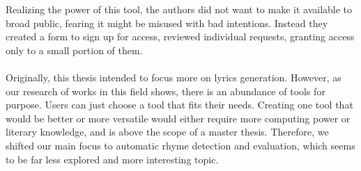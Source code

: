 Realizing the power of this tool, the authors did not want to make it available to broad public, fearing it might be misused with bad intentions. Instead they created a form to sign up for access, reviewed individual requests, granting access only to a small portion of them.



\paragraph{}Originally, this thesis intended to focus more on lyrics generation. However, as our research of works in this field shows, there is an abundance of tools for  purpose. Users can just choose a tool that fits their needs. Creating one tool that would be better or more versatile would either require more computing power or literary knowledge, and is above the scope of a master thesis. Therefore, we shifted our main focus to automatic rhyme detection and evaluation, which seems to be far less explored and more interesting topic.


